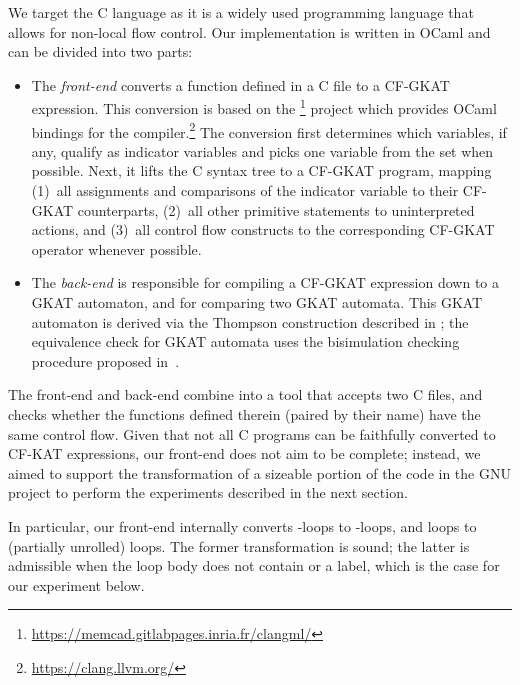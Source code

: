 We target the C language as it is a widely used programming language that allows for non-local flow control.
Our implementation is written in OCaml and can be divided into two parts:
\begin{itemize}
    \item
    The \emph{front-end} converts a function defined in a C file to a CF-GKAT expression.
    This conversion is based on the \footnote{\url{https://memcad.gitlabpages.inria.fr/clangml/}} project which provides OCaml bindings for the  compiler.\footnote{\url{https://clang.llvm.org/}}
    The conversion first determines which variables, if any, qualify as indicator variables and picks one variable from the set when possible.
    Next, it lifts the C syntax tree to a CF-GKAT program, mapping (1)~all assignments and comparisons of the indicator variable to their CF-GKAT counterparts, (2)~all other primitive statements to uninterpreted actions, and (3)~all control flow constructs to the corresponding CF-GKAT operator whenever possible.
    \item
    The \emph{back-end} is responsible for compiling a CF-GKAT expression down to a GKAT automaton, and for comparing two GKAT automata.
    This GKAT automaton is derived via the Thompson construction described in ; the equivalence check for GKAT automata uses the bisimulation checking procedure proposed in~\cite{Smolka_Foster_Hsu_Kappé_Kozen_Silva_2020}.
\end{itemize}

The front-end and back-end combine into a tool that accepts two C files, and checks whether the functions defined therein (paired by their name) have the same control flow.
Given that not all C programs can be faithfully converted to CF-KAT expressions, our front-end does not aim to be complete; instead, we aimed to support the transformation of a sizeable portion of the code in the GNU  project to perform the experiments described in the next section.

\begin{remark}
In particular, our front-end internally converts -loops to -loops, and  loops to (partially unrolled)  loops. The former transformation is sound; the latter is admissible when the loop body does not contain  or a label, which is the case for our experiment below.
\end{remark}

